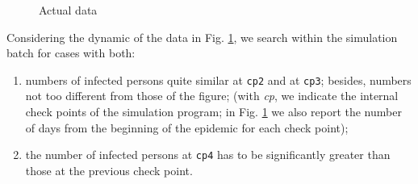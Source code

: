 \documentclass[graybox]{svmult}
\begin{document}
\begin{figure}[t]

 \begin{subfigure}{0.48\textwidth}
 \centering
 \label{actualA}
 \end{subfigure}
 \hfill
 \begin{subfigure}{0.48\textwidth}
 \centering
 \label{actualB}
 \end{subfigure}
 \caption{Actual data}
 \label{actualData}
\end{figure}



Considering the dynamic of the data in Fig. \ref{actualA}, we search within the simulation batch for cases with both:

\begin{enumerate}[label=\roman*]
\item numbers of infected persons quite similar at \verb|cp2| and at \verb|cp3|; besides, numbers not too different from those of the figure; 
(with \emph{cp}, we indicate the internal check points of the simulation program; in Fig. \ref{actualA} we also report the number of days from the beginning of the epidemic for each check point); 

\item the number of infected persons at \verb|cp4| has to be significantly greater than those at the previous check point.

\end{enumerate}
\end{document}
